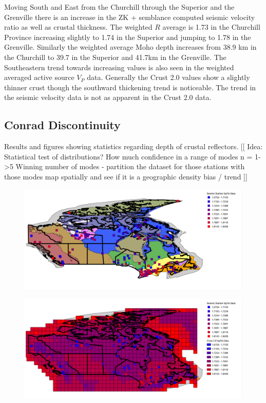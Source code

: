 \documentclass[draft, 12pt]{article}
\begin{document}
Moving South and East from the Churchill through the Superior and the Grenville there is an increase in the ZK + semblance computed seismic velocity ratio as well as crustal thickness. The weighted $R$ average is 1.73 in the Churchill Province increasing slightly to 1.74 in the Superior and jumping to 1.78 in the Grenville. Similarly the weighted average Moho depth increases from 38.9 km in the Churchill to 39.7 in the Superior and 41.7km in the Grenville. The Southeastern trend towards increasing values is also seen in the weighted averaged active source $V_P$ data.  Generally the Crust 2.0 values show a slightly thinner crust though the southward thickening trend is noticeable. The trend in the seismic velocity data is not as apparent in the Crust 2.0 data.

\subsection{Conrad Discontinuity}
Results and figures showing statistics regarding depth of crustal reflectors.
[[ Idea: Statistical test of distributions? How much confidence in a range of modes n = 1->5
   Winning number of modes - partition the dataset for those stations with those modes
   map spatially and see if it is a geographic density bias / trend ]]


\begin{figure}
  \centering
  \includegraphics[width=\textwidth]{VpVsMap}
  \caption{}
  \label{fig:VpVsMap}
\end{figure}

\begin{figure}
  \centering
  \includegraphics[width=\textwidth]{VpVsMapCrust}
  \caption{}
  \label{fig:VpVsMapCrust}
\end{figure}
\end{document}
